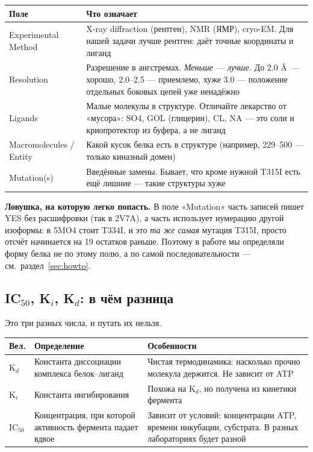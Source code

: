 \documentclass[11pt,a4paper]{article}
\newcommand{\code}[1]{{\ttfamily #1}}
\begin{document}
\begin{center}
\small
\begin{tabular}{L{4.0cm}L{10.6cm}}
\toprule
\textbf{Поле} & \textbf{Что означает} \\
\midrule
Experimental Method & X-ray diffraction (рентген), NMR (ЯМР), cryo-EM. Для нашей задачи лучше рентген: даёт точные координаты и лиганд \\
Resolution & Разрешение в ангстремах. \emph{Меньше --- лучше.} До 2.0 \AA\ --- хорошо, 2.0--2.5 --- приемлемо, хуже 3.0 --- положение отдельных боковых цепей уже ненадёжно \\
Ligands & Малые молекулы в структуре. Отличайте лекарство от «мусора»: SO4, GOL (глицерин), CL, NA --- это соли и криопротектор из буфера, а не лиганд \\
Macromolecules / Entity & Какой кусок белка есть в структуре (например, 229--500 --- только киназный домен) \\
Mutation(s) & Введённые замены. Бывает, что кроме нужной T315I есть ещё лишние --- такие структуры хуже \\
\bottomrule
\end{tabular}
\end{center}

\begin{note}
\textbf{Ловушка, на которую легко попасть.} В поле «Mutation» часть записей
пишет \code{YES} без расшифровки (так в 2V7A), а часть использует нумерацию другой
изоформы: в \code{5MO4} стоит \code{T334I}, и это \emph{та же самая} мутация
T315I, просто отсчёт начинается на 19 остатков раньше. Поэтому в работе мы
определяли форму белка не по этому полю, а по самой последовательности ---
см.~раздел~\ref{sec:howto}.
\end{note}

\subsection{IC$_{50}$, K$_i$, K$_d$: в чём разница}

Это три разных числа, и путать их нельзя.

\begin{center}
\small
\begin{tabular}{L{1.5cm}L{5.2cm}L{7.8cm}}
\toprule
\textbf{Вел.} & \textbf{Определение} & \textbf{Особенности} \\
\midrule
K$_d$ & Константа диссоциации комплекса белок--лиганд & Чистая термодинамика: насколько прочно молекула держится. Не зависит от ATP \\
K$_i$ & Константа ингибирования & Похожа на K$_d$, но получена из кинетики фермента \\
IC$_{50}$ & Концентрация, при которой активность фермента падает вдвое & Зависит от условий: концентрации ATP, времени инкубации, субстрата. В разных лабораториях будет разной \\
\bottomrule
\end{tabular}
\end{center}
\end{document}
